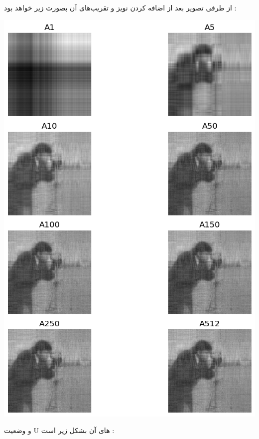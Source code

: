 \documentclass[a4paper, 12pt]{article}
\begin{document}
	از طرفی تصویر بعد از اضافه کردن نویز و تقریب‌های آن بصورت زیر خواهد بود :
	\begin{center}
		\includegraphics[scale=0.5]{fig3.png}
	\end{center}
و وضعیت U های آن بشکل زیر است :
\end{document}
